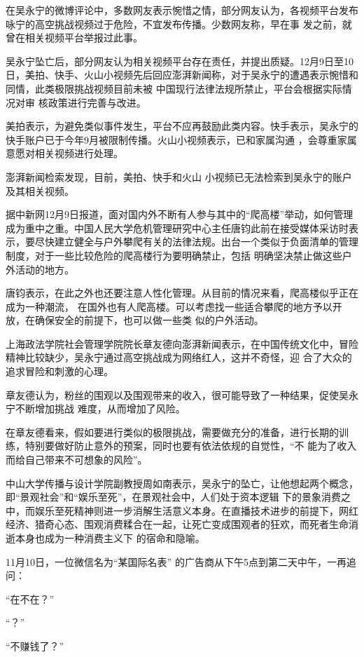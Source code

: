\documentclass{article}
\begin{document}
在吴永宁的微博评论中，多数网友表示惋惜之情，部分网友认为，各视频平台发布咏宁的高空挑战视频过于危险，不宜发布传播。少数网友称，早在事
发之前，就曾在相关视频平台举报过此事。 

吴永宁坠亡后，部分网友认为相关视频平台存在责任，并提出质疑。12月9日至10日，美拍、快手、火山小视频先后回应澎湃新闻称，对于吴永宁的遭遇表示惋惜和同情，此类极限挑战视频目前未被
\newpage
中国现行法律法规所禁止，平台会根据实际情况对审
核政策进行完善与改进。 

美拍表示，为避免类似事件发生，平台不应再鼓励此类内容。快手表示，吴永宁的快手账户已于今年9月被限制传播。火山小视频表示，已和家属沟通
，会尊重家属意愿对相关视频进行处理。 

澎湃新闻检索发现，目前，美拍、快手和火山
小视频已无法检索到吴永宁的账户及其相关视频。 

据中新网12月9日报道，面对国内外不断有人参与其中的“爬高楼”举动，如何管理成为重中之重。中国人民大学危机管理研究中心主任唐钧此前在接受媒体采访时表示，要尽快建立健全与户外攀爬有关的法律法规。出台一个类似于负面清单的管理制度，对于一些比较危险的爬高楼行为要明确禁止，包括
明确坚决禁止做这些户外活动的地方。 

唐钧表示，在此之外也还要注意人性化管理。从目前的情况来看，爬高楼似乎正在成为一种潮流，
\newpage
在国外也有人爬高楼。可以考虑找一些适合攀爬的地方予以开放，在确保安全的前提下，也可以做一些类
似的户外活动。 

上海政法学院社会管理学院院长章友德向澎湃新闻表示，在中国传统文化中，冒险精神比较缺少，吴永宁通过高空挑战成为网络红人，这并不奇怪，迎
合了大众的追求冒险和刺激的心理。 

章友德认为，粉丝的围观以及围观带来的收入，很可能导致了一种结果，促使吴永宁不断增加挑战
难度，从而增加了风险。 

在章友德看来，假如要进行类似的极限挑战，需要做充分的准备，进行长期的训练，特别要做好防止意外的预案，同时也要有依法依规的自觉性，“不
能为了收入而给自己带来不可想象的风险”。 

中山大学传播与设计学院副教授周如南表示，吴永宁的坠亡，让他想起两个概念，即“景观社会”和“娱乐至死”，在景观社会中，人们处于资本逻辑
\newpage
下的景象消费之中，而娱乐至死精神则进一步消解生活意义本身。在直播技术进步的前提下，网红经济、猎奇心态、围观消费糅合在一起，让死亡变成围观者的狂欢，而死者生命消逝本身也成为一种消费主义下
的宿命和隐喻。 

11月10日，一位微信名为“某国际名表”
的广告商从下午5点到第二天中午，一再追问： 


“在不在？” 



“？” 


“不赚钱了？” 
\end{document}
